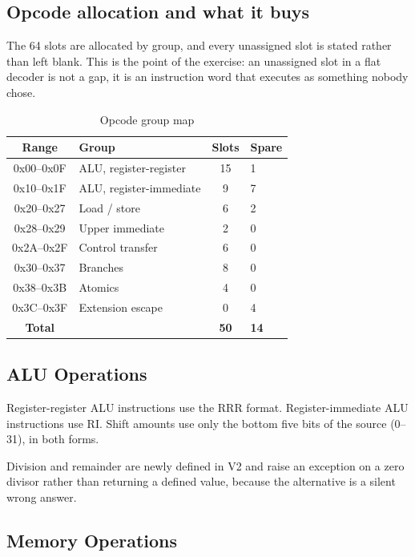 \documentclass[11pt,a4paper]{article}
\begin{document}
\subsection{Opcode allocation and what it buys}

The 64 slots are allocated by group, and every unassigned slot is stated
rather than left blank. This is the point of the exercise: an unassigned slot
in a flat decoder is not a gap, it is an instruction word that executes as
something nobody chose.

\begin{table}[htbp]
\centering
\caption{Opcode group map}
\begin{tabular}{clcl}
\toprule
Range & Group & Slots & Spare \\
\midrule
0x00--0x0F & ALU, register-register   & 15 & 1 \\
0x10--0x1F & ALU, register-immediate & 9  & 7 \\
0x20--0x27 & Load / store             & 6  & 2 \\
0x28--0x29 & Upper immediate          & 2  & 0 \\
0x2A--0x2F & Control transfer         & 6  & 0 \\
0x30--0x37 & Branches                 & 8  & 0 \\
0x38--0x3B & Atomics                  & 4  & 0 \\
0x3C--0x3F & Extension escape         & 0  & 4 \\
\midrule
\textbf{Total} & & \textbf{50} & \textbf{14} \\
\bottomrule
\end{tabular}
\end{table}

\subsection{ALU Operations}

Register-register ALU instructions use the RRR format. Register-immediate ALU
instructions use RI. Shift amounts use only the bottom five bits of the source
(0--31), in both forms.

Division and remainder are newly defined in V2 and raise an exception on a zero
divisor rather than returning a defined value, because the alternative is a
silent wrong answer.

\subsection{Memory Operations}
\end{document}

